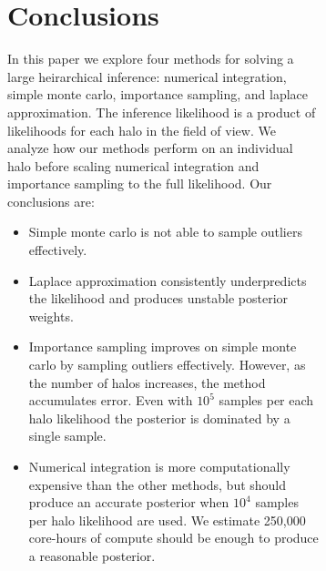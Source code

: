 \documentclass[\docopts]{\docclass}
\begin{document}
\begin{figure}[h!]
\begin{figure}[h!]







\section{Conclusions}
\label{sec:conclusions}

In this paper we explore four methods for solving a large heirarchical inference: numerical integration, simple monte carlo, importance sampling, and laplace approximation. The inference likelihood is a product of likelihoods for each halo in the field of view. We analyze how our methods perform on an individual halo before scaling numerical integration and importance sampling to the full likelihood. Our conclusions are:

\begin{itemize}
\item Simple monte carlo is not able to sample outliers effectively.
\item Laplace approximation consistently underpredicts the likelihood and produces unstable posterior weights.
\item Importance sampling improves on simple monte carlo by sampling outliers effectively. However, as the number of halos increases, the method accumulates error. Even with $10^5$ samples per each halo likelihood the posterior is dominated by a single sample. 
\item Numerical integration is more computationally expensive than the other methods, but should produce an accurate posterior when $10^4$ samples per halo likelihood are used. We estimate 250,000 core-hours of compute should be enough to produce a reasonable posterior.
\end{itemize}


\end{figure}
\end{figure}
\end{document}

